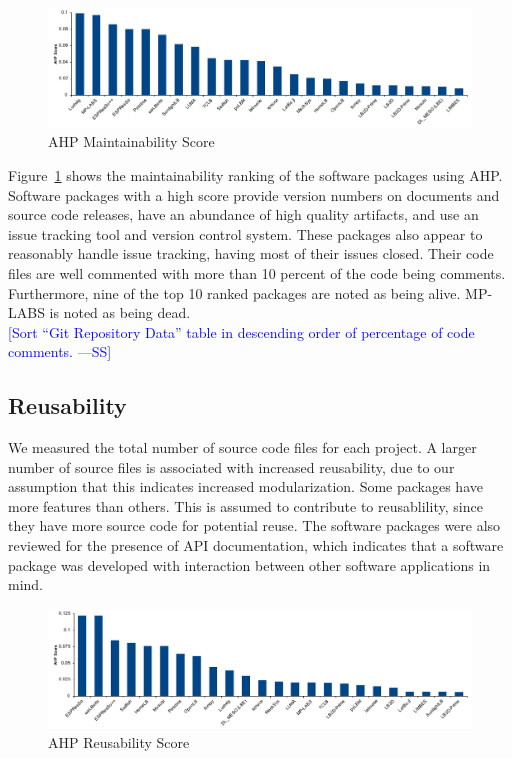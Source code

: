 \documentclass[final, 3p, times, authoryear]{elsarticle}
\newcommand{\authornote}[3]{\textcolor{#1}{[#3 ---#2]}}
\newcommand{\authornote}[3]{}
\newcommand{\wss}[1]{\authornote{blue}{SS}{#1}} %
\begin{document}
\begin{figure}[h!]
	\begin{center}
		\includegraphics[width=1.0\textwidth]{./figures/maintainability_chart.pdf}
		\caption{AHP Maintainability Score}
		\label{Fig_Maintainability}
	\end{center}
\end{figure}

Figure~\ref{Fig_Maintainability} shows the maintainability ranking of the
software packages using AHP. Software packages with a high score provide version
numbers on documents and source code releases, have an abundance of high quality
artifacts, and use an issue tracking tool and version control system. These
packages also appear to reasonably handle issue tracking, having most of their
issues closed. Their code files are well commented with more than 10 percent of
the code being comments. Furthermore, nine of the top 10 ranked packages are
noted as being alive. MP-LABS is noted as being dead.\\

\wss{Sort ``Git Repository Data'' table in descending order of percentage of
code comments.}

\subsection{Reusability} \label{reusabilityresults}

We measured the total number of source code files for each project. A larger
number of source files is associated with increased reusability, due to our
assumption that this indicates increased modularization. Some packages have more
features than others.  This is assumed to contribute to reusablility, since they have
more source code for potential reuse. The software packages were also reviewed
for the presence of API documentation, which indicates that a software package
was developed with interaction between other software applications in mind. 

\begin{figure}[h!]
	\begin{center}
		\includegraphics[width=1.0\textwidth]{./figures/reusability_chart.pdf}
		\caption{AHP Reusability Score}
		\label{Fig_Reusabilty}
	\end{center}
\end{figure}
\end{document}
